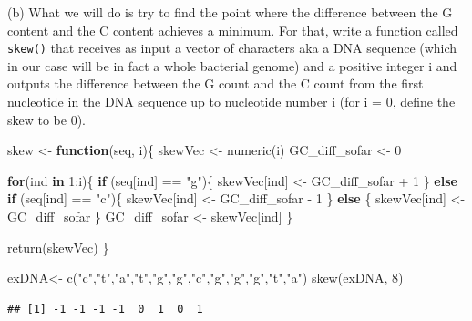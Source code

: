 \documentclass[
]{article}
\newenvironment{Shaded}{\begin{snugshade}}{\end{snugshade}}
\newcommand{\ControlFlowTok}[1]{\textcolor[rgb]{0.13,0.29,0.53}{\textbf{#1}}}
\newcommand{\DecValTok}[1]{\textcolor[rgb]{0.00,0.00,0.81}{#1}}
\newcommand{\FunctionTok}[1]{\textcolor[rgb]{0.00,0.00,0.00}{#1}}
\newcommand{\NormalTok}[1]{#1}
\newcommand{\OtherTok}[1]{\textcolor[rgb]{0.56,0.35,0.01}{#1}}
\newcommand{\SpecialCharTok}[1]{\textcolor[rgb]{0.00,0.00,0.00}{#1}}
\newcommand{\StringTok}[1]{\textcolor[rgb]{0.31,0.60,0.02}{#1}}
\begin{document}
(b) What we will do is try to find the point where the difference
between the G content and the C content achieves a minimum. For that,
write a function called \texttt{skew()} that receives as input a vector
of characters aka a DNA sequence (which in our case will be in fact a
whole bacterial genome) and a positive integer i and outputs the
difference between the G count and the C count from the first nucleotide
in the DNA sequence up to nucleotide number i (for i = 0, define the
skew to be 0). \span

\begin{Shaded}
\begin{Highlighting}[]
\NormalTok{skew }\OtherTok{\textless{}{-}} \ControlFlowTok{function}\NormalTok{(seq, i)\{}
\NormalTok{  skewVec }\OtherTok{\textless{}{-}} \FunctionTok{numeric}\NormalTok{(i)}
\NormalTok{  GC\_diff\_sofar }\OtherTok{\textless{}{-}} \DecValTok{0}
  
  \ControlFlowTok{for}\NormalTok{(ind }\ControlFlowTok{in} \DecValTok{1}\SpecialCharTok{:}\NormalTok{i)\{}
    \ControlFlowTok{if}\NormalTok{ (seq[ind] }\SpecialCharTok{==} \StringTok{"g"}\NormalTok{)\{}
\NormalTok{      skewVec[ind] }\OtherTok{\textless{}{-}}\NormalTok{ GC\_diff\_sofar }\SpecialCharTok{+} \DecValTok{1} 
\NormalTok{    \}}
    \ControlFlowTok{else} \ControlFlowTok{if}\NormalTok{ (seq[ind] }\SpecialCharTok{==} \StringTok{"c"}\NormalTok{)\{}
\NormalTok{      skewVec[ind] }\OtherTok{\textless{}{-}}\NormalTok{ GC\_diff\_sofar }\SpecialCharTok{{-}} \DecValTok{1} 
\NormalTok{    \}}
    \ControlFlowTok{else}\NormalTok{ \{}
\NormalTok{      skewVec[ind] }\OtherTok{\textless{}{-}}\NormalTok{ GC\_diff\_sofar}
\NormalTok{    \}}
\NormalTok{    GC\_diff\_sofar }\OtherTok{\textless{}{-}}\NormalTok{ skewVec[ind]}
\NormalTok{  \}}
  
  \FunctionTok{return}\NormalTok{(skewVec)}
\NormalTok{\}}

\NormalTok{exDNA}\OtherTok{\textless{}{-}} \FunctionTok{c}\NormalTok{(}\StringTok{"c"}\NormalTok{,}\StringTok{"t"}\NormalTok{,}\StringTok{"a"}\NormalTok{,}\StringTok{"t"}\NormalTok{,}\StringTok{"g"}\NormalTok{,}\StringTok{"g"}\NormalTok{,}\StringTok{"c"}\NormalTok{,}\StringTok{"g"}\NormalTok{,}\StringTok{"g"}\NormalTok{,}\StringTok{"g"}\NormalTok{,}\StringTok{"t"}\NormalTok{,}\StringTok{"a"}\NormalTok{)}
\FunctionTok{skew}\NormalTok{(exDNA, }\DecValTok{8}\NormalTok{)}
\end{Highlighting}
\end{Shaded}

\begin{verbatim}
## [1] -1 -1 -1 -1  0  1  0  1
\end{verbatim}
\end{document}
